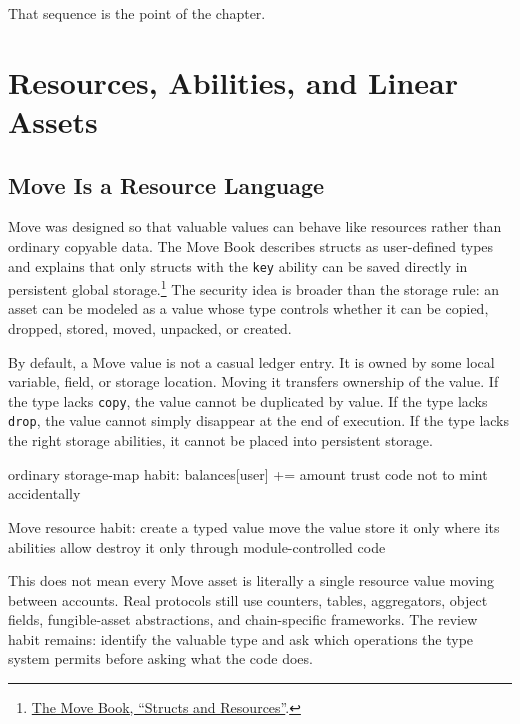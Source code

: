 That sequence is the point of the chapter.

\section{Resources, Abilities, and Linear Assets}

\subsection{Move Is a Resource Language}

Move was designed so that valuable values can behave like resources rather than ordinary copyable data. The Move Book describes structs as user-defined types and explains that only structs with the \texttt{key} ability can be saved directly in persistent global storage.\footnote{\href{https://move-language.github.io/move/structs-and-resources.html}{The Move Book, ``Structs and Resources''}.} The security idea is broader than the storage rule: an asset can be modeled as a value whose type controls whether it can be copied, dropped, stored, moved, unpacked, or created.

By default, a Move value is not a casual ledger entry. It is owned by some local variable, field, or storage location. Moving it transfers ownership of the value. If the type lacks \texttt{copy}, the value cannot be duplicated by value. If the type lacks \texttt{drop}, the value cannot simply disappear at the end of execution. If the type lacks the right storage abilities, it cannot be placed into persistent storage.

\begin{codeblock}
ordinary storage-map habit:
    balances[user] += amount
    trust code not to mint accidentally

Move resource habit:
    create a typed value
    move the value
    store it only where its abilities allow
    destroy it only through module-controlled code
\end{codeblock}

This does not mean every Move asset is literally a single resource value moving between accounts. Real protocols still use counters, tables, aggregators, object fields, fungible-asset abstractions, and chain-specific frameworks. The review habit remains: identify the valuable type and ask which operations the type system permits before asking what the code does.

